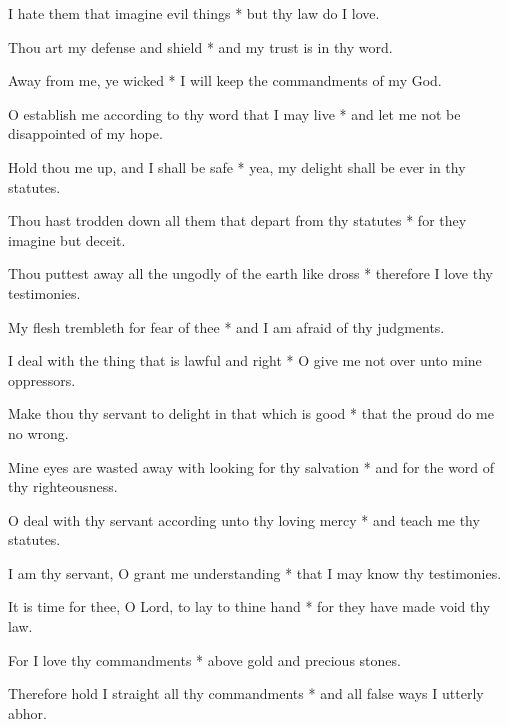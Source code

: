 I hate them that imagine evil things * but thy law do I love.

Thou art my defense and shield * and my trust is in thy word.

Away from me, ye wicked * I will keep the commandments of my God.

O establish me according to thy word that I may live * and let me not be disappointed of my hope.

Hold thou me up, and I shall be safe * yea, my delight shall be ever in thy statutes.

Thou hast trodden down all them that depart from thy statutes * for they imagine but deceit.

Thou puttest away all the ungodly of the earth like dross * therefore I love thy testimonies.

My flesh trembleth for fear of thee * and I am afraid of thy judgments.

I deal with the thing that is lawful and right * O give me not over unto mine oppressors.

Make thou thy servant to delight in that which is good * that the proud do me no wrong.

Mine eyes are wasted away with looking for thy salvation * and for the word of thy righteousness.

O deal with thy servant according unto thy loving mercy * and teach me thy statutes.

I am thy servant, O grant me understanding * that I may know thy testimonies.

It is time for thee, O Lord, to lay to thine hand * for they have made void thy law.

For I love thy commandments * above gold and precious stones.

Therefore hold I straight all thy commandments * and all false ways I utterly abhor. 